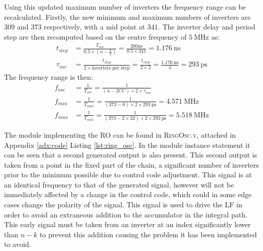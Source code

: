 Using this updated maximum number of inverters the frequency range can be recalculated. Firstly, the new minimum and maximum numbers of inverters are $309$ and $373$ respectively, with a mid point at $341$. The inverter delay and period step are then recomputed based on the centre frequency of $5~\si{\mega\hertz}$ as:
\begin{align}
t_{step} &= \frac{T_{osc}}{0.5\times(n-\frac{k}{2})} = \frac{200\si{\nano\second}}{0.5\times 341} = 1.176~\si{\nano\second} \\
\tau_{inv} &= \frac{t_{step}}{2\times\text{inverters per step}} = \frac{t_{step}}{2\times2} = \frac{1.176~\si{\nano\second}}{4} = 293~\si{\pico\second}
\end{align}
The frequency range is then:
\begin{align} 
f_{osc} &= \frac{1}{T_{osc}} = \frac{1}{(n-2CC)\times 2\times\tau_{inv}} \\
f_{min} &= \frac{1}{T_{max}} = \frac{1}{(373-0)\times 2\times 293~\si{\pico\second}} = 4.571~\si{\mega\hertz} \\
f_{max} &= \frac{1}{T_{min}} = \frac{1}{(373-2\times32)\times 2\times 293~\si{\pico\second}} = 5.518~\si{\mega\hertz}
\end{align}

The module implementing the \ac{RO} can be found in \textsc{RingOsc.v}, attached in Appendix \ref{adx:code} Listing \ref{lst:ring_osc}. In the module instance statement it can be seen that a second generated output is also present. This second output is taken from a point in the fixed part of the chain, a significant number of inverters prior to the minimum possible due to control code adjustment. This signal is at an identical frequency to that of the generated signal, however will not be immediately affected by a change in the control code, which could in some edge cases change the polarity of the signal. This signal is used to drive the \ac{LF} in order to avoid an extraneous addition to the accumulator in the integral path. This early signal must be taken from an inverter at an index significantly lower than $n-k$ to prevent this addition causing the problem it has been implemented to avoid.

